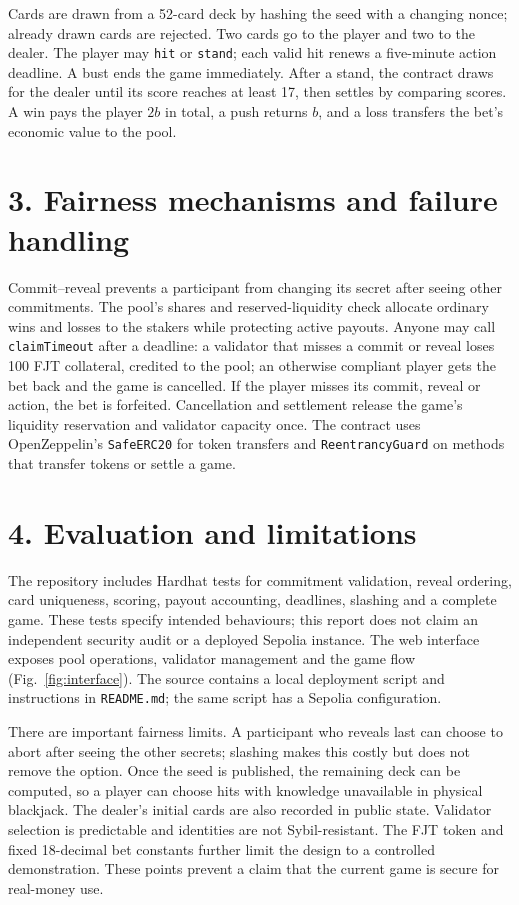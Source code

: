 \documentclass[10pt,a4paper]{article}
\begin{document}
Cards are drawn from a 52-card deck by hashing the seed with a changing nonce;
already drawn cards are rejected. Two cards go to the player and two to the
dealer. The player may \texttt{hit} or \texttt{stand}; each valid hit renews a
five-minute action deadline. A bust ends the game immediately. After a stand,
the contract draws for the dealer until its score reaches at least 17, then
settles by comparing scores. A win pays the player $2b$ in total, a push
returns $b$, and a loss transfers the bet's economic value to the pool.

\newpage
\section*{3. Fairness mechanisms and failure handling}
Commit--reveal prevents a participant from changing its secret after seeing
other commitments. The pool's shares and reserved-liquidity check allocate
ordinary wins and losses to the stakers while protecting active payouts.
Anyone may call \texttt{claimTimeout} after a deadline: a validator that
misses a commit or reveal loses 100 FJT collateral, credited to the pool;
an otherwise compliant player gets the bet back and the game is cancelled.
If the player misses its commit, reveal or action, the bet is forfeited.
Cancellation and settlement release the game's liquidity reservation and
validator capacity once. The contract uses OpenZeppelin's \texttt{SafeERC20}
for token transfers and \texttt{ReentrancyGuard} on methods that transfer
tokens or settle a game.

\section*{4. Evaluation and limitations}
The repository includes Hardhat tests for commitment validation, reveal
ordering, card uniqueness, scoring, payout accounting, deadlines, slashing
and a complete game. These tests specify intended behaviours; this report
does not claim an independent security audit or a deployed Sepolia instance.
The web interface exposes pool operations, validator management and the game
flow (Fig.~\ref{fig:interface}). The source contains a local deployment script and instructions in
\texttt{README.md}; the same script has a Sepolia configuration.

There are important fairness limits. A participant who reveals last can
choose to abort after seeing the other secrets; slashing makes this costly
but does not remove the option. Once the seed is published, the remaining
deck can be computed, so a player can choose hits with knowledge unavailable
in physical blackjack. The dealer's initial cards are also recorded in
public state. Validator selection is predictable and identities are not
Sybil-resistant. The FJT token and fixed 18-decimal bet constants further
limit the design to a controlled demonstration. These points prevent a claim
that the current game is secure for real-money use.
\end{document}
